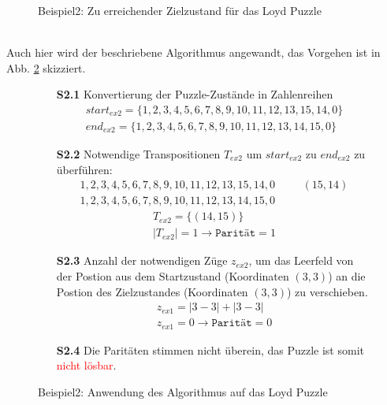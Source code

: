 \begin{minipage}{\linewidth}
\begin{minipage}[t]{0.45\linewidth}
\begin{figure}[H]
			\captionsetup{format=plain, indention=0pt}
			\caption{\label{fig:Ex2_end}Beispiel2: Zu erreichender Zielzustand für das Loyd Puzzle}
		\end{figure}
	\end{minipage}
\end{minipage}\\\WNL%
Auch hier wird der beschriebene Algorithmus angewandt, das Vorgehen ist in Abb. \ref{fig:Ex2_algo} skizziert.
\begin{figure}[H]
	\begin{enumerate}
		\item[\textbf{S2.1}] Konvertierung der Puzzle-Zustände in Zahlenreihen
		      \begin{align*}
			      start_{ex2} = \{1,2,3,4,5,6,7,8,9,10,11,12,13,15,14,0\} \\
			      end_{ex2} = \{1,2,3,4,5,6,7,8,9,10,11,12,13,14,15,0\}
		      \end{align*}
		\item[\textbf{S2.2}] Notwendige Transpositionen $T_{ex2}$ um $start_{ex2}$ zu $end_{ex2}$ zu überführen:
		      \begin{align*}
			      1,2,3,4,5,6,7,8,9,10,11,12,13,15,14,0 & \hspace{20pt} (15,14) \\
			      1,2,3,4,5,6,7,8,9,10,11,12,13,14,15,0 &
		      \end{align*}
		      \begin{align*}
			      T_{ex2} = \{(14,15)\} \\
			      \left\vert T_{ex2}\right\vert = 1 \rightarrow \texttt{Parität} = 1
		      \end{align*}
		\item[\textbf{S2.3}] Anzahl der notwendigen Züge $z_{ex2}$, um das Leerfeld von der Postion aus dem Startzustand (Koordinaten $(3,3)$) an die Postion des Zielzustandes (Koordinaten $(3,3)$) zu verschieben.
		      \begin{align*}
			      z_{ex1} = \left | 3 - 3 \right | + \left | 3 - 3 \right | \\
			      z_{ex1} = 0 \rightarrow \texttt{Parität} = 0
		      \end{align*}
		\item[\textbf{S2.4}] Die Paritäten stimmen nicht überein, das Puzzle ist somit \textcolor{red}{nicht lösbar}.
	\end{enumerate}
	\caption{Beispiel2: Anwendung des Algorithmus auf das Loyd Puzzle \label{fig:Ex2_algo}}
\end{figure}
